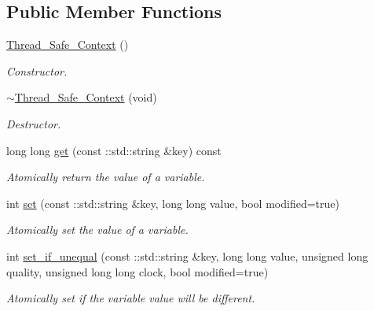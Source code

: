 \subsection*{Public Member Functions}
\begin{DoxyCompactItemize}
\item 
\hyperlink{classMadara_1_1Knowledge__Engine_1_1Thread__Safe__Context_ae9ffa2c965b7d6b9a5abbf27481ea633}{Thread\_\-Safe\_\-Context} ()
\begin{DoxyCompactList}\small\item\em Constructor. \item\end{DoxyCompactList}\item 
\hyperlink{classMadara_1_1Knowledge__Engine_1_1Thread__Safe__Context_a398941437526d7ad94a875327dc3f9d9}{$\sim$Thread\_\-Safe\_\-Context} (void)
\begin{DoxyCompactList}\small\item\em Destructor. \item\end{DoxyCompactList}\item 
long long \hyperlink{classMadara_1_1Knowledge__Engine_1_1Thread__Safe__Context_ac340373d2f4c22aa443e9f5e3ee8d3d5}{get} (const ::std::string \&key) const 
\begin{DoxyCompactList}\small\item\em Atomically return the value of a variable. \item\end{DoxyCompactList}\item 
int \hyperlink{classMadara_1_1Knowledge__Engine_1_1Thread__Safe__Context_a3e1c5decbb3292ded800fd0d9d797737}{set} (const ::std::string \&key, long long value, bool modified=true)
\begin{DoxyCompactList}\small\item\em Atomically set the value of a variable. \item\end{DoxyCompactList}\item 
int \hyperlink{classMadara_1_1Knowledge__Engine_1_1Thread__Safe__Context_aa82eaaeaaa80462a098158925baa7b47}{set\_\-if\_\-unequal} (const ::std::string \&key, long long value, unsigned long quality, unsigned long long clock, bool modified=true)
\begin{DoxyCompactList}\small\item\em Atomically set if the variable value will be different. \item\end{DoxyCompactList}\item 

\end{DoxyCompactItemize}
